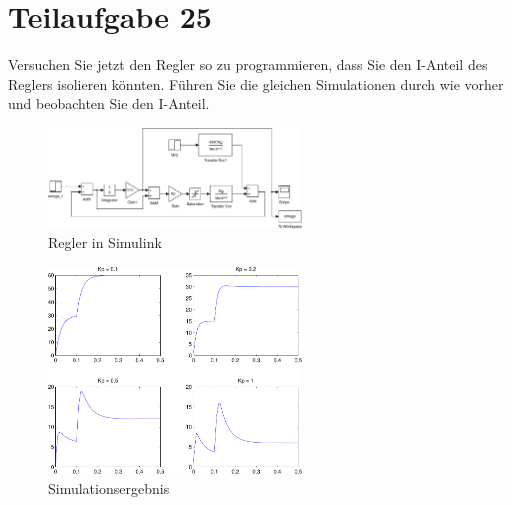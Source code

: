 \section{Teilaufgabe 25}
\begin{aufgabe}
    Versuchen Sie jetzt den Regler so zu programmieren, dass Sie den I-Anteil 
    des Reglers isolieren könnten. Führen Sie die gleichen Simulationen durch 
    wie vorher und beobachten Sie den I-Anteil.
\end{aufgabe}
\begin{figure}[h!]
    \centering
    \includegraphics[width=0.6\textwidth]{25/regler_sat_isep.pdf}
    \caption{Regler in Simulink}
    \label{fig:25}
\end{figure}
\begin{figure}[h!]
    \centering
    \includegraphics[width=0.6\textwidth]{25/regler_sat_isep_plot.pdf}
    \caption{Simulationsergebnis}
    \label{fig:25plot}
\end{figure}
